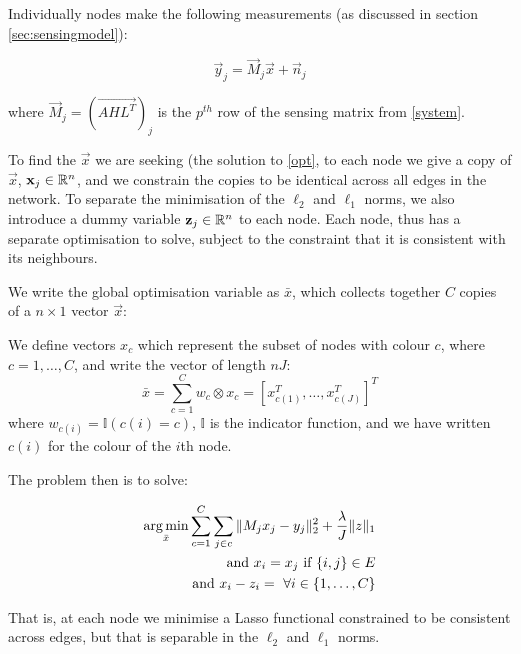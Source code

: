 \documentclass[conference]{IEEEtran}
\begin{document}
Individually nodes make the following measurements (as discussed in section \ref{sec:sensingmodel}):

\begin{equation}
\vec{y}_j = \vec{M}_j\vec{x} + \vec{n}_j
\end{equation}

where \(\vec{M}_j = \left(\vec{AHL^T}\right)_j \) is the \(p^{th} \) row of the sensing matrix from \eqref{system}.

To find the \(\vec{x}\) we are seeking (the solution to \eqref{opt}, to each node we give a copy of \(\vec{x}\), \(\mathbf{x}_j \in {\mathbb{R}}^n\), and we constrain the copies to be identical across all edges in the network. To separate the minimisation of the \(\ell_2\) and \(\ell_1\) norms, we also introduce a dummy variable \(\mathbf{z}_j \in {\mathbb{R}}^n\) to each node. Each node, thus has a separate optimisation to solve, subject to the constraint that it is consistent with its neighbours.

We write the global optimisation variable as \(\bar{x}\), which collects together \(C\) copies of a \(n\times 1\) vector \(\vec{x}\):

\begin{defn}
We define vectors \(x_c\) which represent the subset of nodes with colour \(c\), where \(c = 1,\ldots , C\), and write the vector of length \(nJ\):
\begin{equation}
\bar{x} = \sum_{c=1}^C w_c \otimes x_c = \left[x_{c(1)}^T, \ldots	, x_{c(J)}^T\right]^T
\label{barxc}
\end{equation}
where \(w_{c(i)} = \mathbb{I}(c(i) = c)\), \(\mathbb{I}\) is the indicator function, and we have written \(c(i)\) for the colour of the \(i\)th node.
\end{defn}

The problem then is to solve:

\begin{align}
\argmin_{\bar{x}} \sum_{c=1}^C \sum_{j \in c} \|M_jx_j - y_j\|_2^2 + \frac{\lambda}{J}\|z\|_1 \nonumber \\ 
\text{ and } x_i = x_j \text{ if } \{i,j\} \in E \nonumber \\
\text{ and } x_i - z_i = \text{ } \forall i \in \{1, \ldots, C\}
\label{constrainedbp}
\end{align}

That is, at each node we minimise a Lasso functional constrained to be consistent across edges, but that is separable in the \(\ell_2\) and \(\ell_1\) norms.
\end{document}
